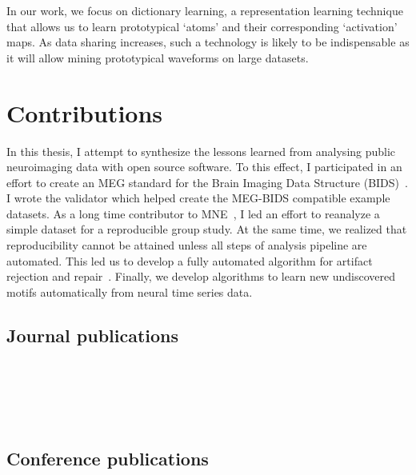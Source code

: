 In our work, we focus on dictionary learning, a representation learning technique that allows us to learn prototypical `atoms' and their corresponding `activation' maps. As data sharing increases, such a technology is likely to be indispensable as it will allow mining prototypical waveforms on large datasets.

\section{Contributions}
In this thesis, I attempt to synthesize the lessons learned from analysing public neuroimaging data with open source software. To this effect, I participated in an effort to create an MEG standard for the Brain Imaging Data Structure (BIDS)~\citep{galan2017meg}. I wrote the validator which helped create the MEG-BIDS compatible example datasets. As a long time contributor to MNE~\citep{gramfort2013meg}, I led an effort to reanalyze a simple dataset for a reproducible group study. At the same time, we realized that reproducibility cannot be attained unless all steps of analysis pipeline are automated. This led us to develop a fully automated algorithm for artifact rejection and repair~\citep{jas2016automated, jas2017autoreject}. Finally, we develop algorithms to learn new undiscovered motifs automatically from neural time series data. 

\subsection*{Journal publications}
 \\ \\
 \\ \\

\subsection*{Conference publications}
 \\ \\
